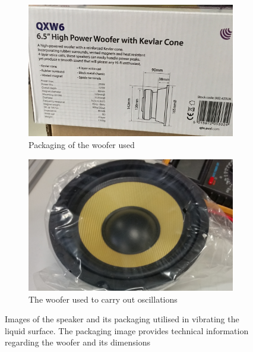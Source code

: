 \begin{figure}[ht]
    \begin{subfigure}{0.5\textwidth}
        \centering
        \includegraphics[width=\textwidth]{prototype/exp_rep_imgs/speakerPackaging.jpg}
        \caption{Packaging of the woofer used}
    \end{subfigure}
    \begin{subfigure}{0.5\textwidth}
        \centering
        \includegraphics[width=\textwidth]{prototype/exp_rep_imgs/Speaker.jpg}
        \caption{The woofer used to carry out oscillations}
    \end{subfigure}
\caption{Images of the speaker and its packaging utilised in vibrating the liquid surface. The packaging image provides technical information regarding the woofer and its dimensions}
\label{fig:speaker}
\end{figure}

